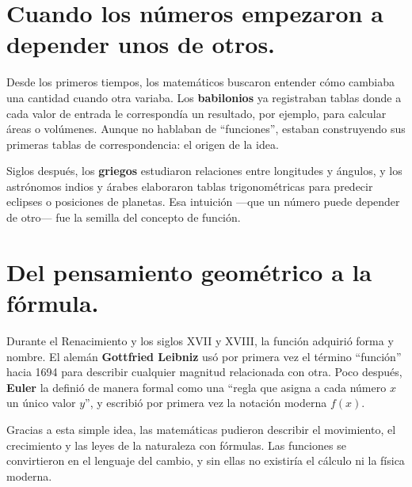 
\vspace{0.5cm}

\vspace{1em}

\section*{Cuando los números empezaron a depender unos de otros.}

\begin{reseñaplana}
Desde los primeros tiempos, los matemáticos buscaron entender cómo cambiaba una cantidad cuando otra variaba.  
Los \textbf{babilonios} ya registraban tablas donde a cada valor de entrada le correspondía un resultado, 
por ejemplo, para calcular áreas o volúmenes.  
Aunque no hablaban de “funciones”, estaban construyendo sus primeras tablas de correspondencia: el origen de la idea.  

Siglos después, los \textbf{griegos} estudiaron relaciones entre longitudes y ángulos, y los astrónomos indios 
y árabes elaboraron tablas trigonométricas para predecir eclipses o posiciones de planetas.  
Esa intuición —que un número puede depender de otro— fue la semilla del concepto de función.  
\end{reseñaplana}

\section*{Del pensamiento geométrico a la fórmula.}
\begin{reseñaplana}
Durante el Renacimiento y los siglos XVII y XVIII, la función adquirió forma y nombre.  
El alemán \textbf{Gottfried Leibniz} usó por primera vez el término “función” hacia 1694 para describir cualquier 
magnitud relacionada con otra.  
Poco después, \textbf{Euler} la definió de manera formal como una “regla que asigna a cada número $x$ un único 
valor $y$”, y escribió por primera vez la notación moderna $f(x)$.  

Gracias a esta simple idea, las matemáticas pudieron describir el movimiento, el crecimiento y las leyes de la naturaleza con fórmulas.  
Las funciones se convirtieron en el lenguaje del cambio, y sin ellas no existiría el cálculo ni la física moderna.  
\end{reseñaplana}

